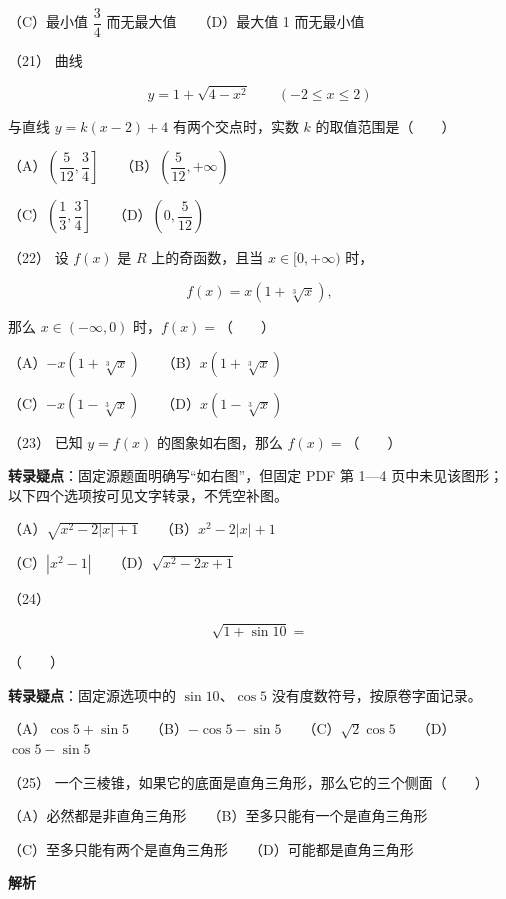 \begin{answer}
（C）最小值 $\dfrac34$ 而无最大值　　（D）最大值 1 而无最小值

（21） 曲线

\nopagebreak[4]
\[
y=1+\sqrt{4-x^2}\qquad(-2\leq x\leq2)
\]

与直线 $y=k(x-2)+4$ 有两个交点时，实数 $k$ 的取值范围是\mbox{（　　）}

（A）$\left(\dfrac5{12},\dfrac34\right]$　　（B）$\left(\dfrac5{12},+\infty\right)$

（C）$\left(\dfrac13,\dfrac34\right]$　　（D）$\left(0,\dfrac5{12}\right)$

（22） 设 $f(x)$ 是 $R$ 上的奇函数，且当 $x\in[0,+\infty)$ 时，

\nopagebreak[4]
\[
f(x)=x(1+\sqrt[3]{x}),
\]

那么 $x\in(-\infty,0)$ 时，$f(x)=$\mbox{（　　）}

（A）$-x(1+\sqrt[3]{x})$　　（B）$x(1+\sqrt[3]{x})$

（C）$-x(1-\sqrt[3]{x})$　　（D）$x(1-\sqrt[3]{x})$

（23） 已知 $y=f(x)$ 的图象如右图，那么 $f(x)=$\mbox{（　　）}

\begin{gktip}
\textbf{转录疑点}：固定源题面明确写“如右图”，但固定 PDF 第 1—4 页中未见该图形；以下四个选项按可见文字转录，不凭空补图。
\end{gktip}

（A）$\sqrt{x^2-2|x|+1}$　　（B）$x^2-2|x|+1$

（C）$|x^2-1|$　　（D）$\sqrt{x^2-2x+1}$

（24）　

\nopagebreak[4]
\[
\sqrt{1+\sin10}=
\]

\mbox{（　　）}

\begin{gktip}
\textbf{转录疑点}：固定源选项中的 $\sin10$、$\cos5$ 没有度数符号，按原卷字面记录。
\end{gktip}

（A）$\cos5+\sin5$　　（B）$-\cos5-\sin5$　　（C）$\sqrt2\cos5$　　（D）$\cos5-\sin5$

（25） 一个三棱锥，如果它的底面是直角三角形，那么它的三个侧面\mbox{（　　）}

（A）必然都是非直角三角形　　（B）至多只能有一个是直角三角形

（C）至多只能有两个是直角三角形　　（D）可能都是直角三角形

\textbf{解析}


\end{answer}
